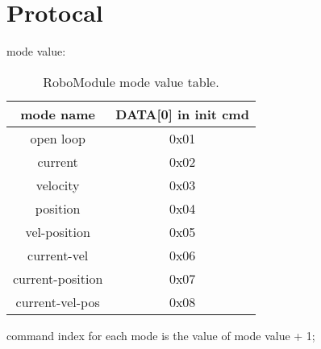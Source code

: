 \section{Protocal}
mode value:
\begin{table}[htb!]
	\caption[RoboModule mode value]{RoboModule mode value table.}
	\begin{tabular}{ c c }
		\toprule
		mode name & DATA[0] in init cmd \\
		\midrule
		open loop  & 0x01  \\
		\midrule
		current  & 0x02  \\
		\midrule
		velocity  & 0x03  \\
		\midrule
		position  & 0x04  \\
		\midrule
		vel-position  & 0x05 \\
		\midrule
		current-vel  & 0x06  \\
		\midrule
		current-position  & 0x07  \\
		\midrule
		current-vel-pos  & 0x08  \\
		\bottomrule
	\end{tabular}
\end{table}

command index for each mode is the value of mode value + 1;